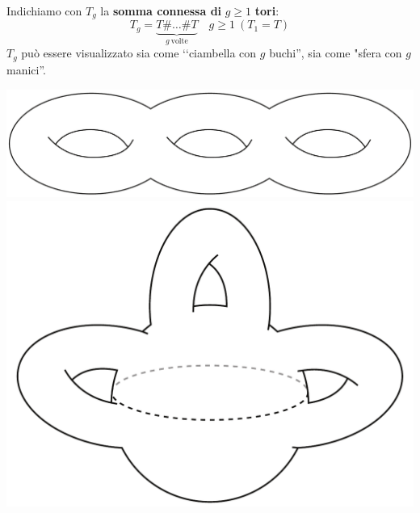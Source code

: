 \begin{define}~{}\\
	Indichiamo con $T_g$ la \textbf{somma connessa di }$g\geq 1$ \textbf{tori}:
	\vspace{-1mm}
	\begin{equation}
		T_g=\underbrace{T\# \ldots\# T}_{g\ \text{volte}}\quad g\geq 1\ \left(T_1=T\right)
	\end{equation}
$T_g$ può essere visualizzato sia come ‘‘ciambella con $g$ buchi'', sia come "sfera con $g$ manici''.
\vspace{-3mm}
\begin{center}
	\includegraphics[trim=0cm 0cm 0cm 0cm, clip, scale=0.23]{images/toruschain.pdf}
	\includegraphics[trim=0cm 0cm 0cm 0cm, clip, scale=0.23]{images/spherewithhandle.pdf}
\end{center}
\vspace{-3mm}
\end{define}
